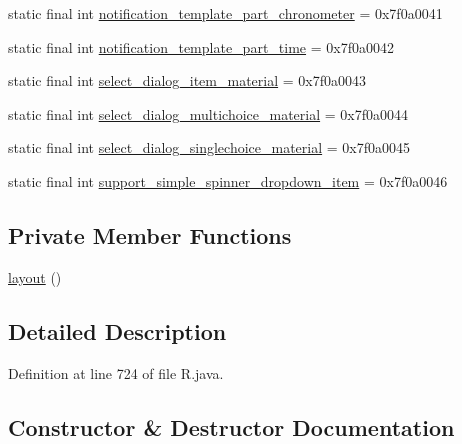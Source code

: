\begin{DoxyCompactItemize}
\item 
static final int \mbox{\hyperlink{classandroid_1_1support_1_1v7_1_1appcompat_1_1_r_1_1layout_a40ec1f0c58d5ef14dcdabd2917b39098}{notification\+\_\+template\+\_\+part\+\_\+chronometer}} = 0x7f0a0041
\item 
static final int \mbox{\hyperlink{classandroid_1_1support_1_1v7_1_1appcompat_1_1_r_1_1layout_a45b077fa0a865191a582090d784b1163}{notification\+\_\+template\+\_\+part\+\_\+time}} = 0x7f0a0042
\item 
static final int \mbox{\hyperlink{classandroid_1_1support_1_1v7_1_1appcompat_1_1_r_1_1layout_ac19040d9099a5f9d5427814ac4a16e37}{select\+\_\+dialog\+\_\+item\+\_\+material}} = 0x7f0a0043
\item 
static final int \mbox{\hyperlink{classandroid_1_1support_1_1v7_1_1appcompat_1_1_r_1_1layout_adaf8230a8b0f528256d97c8817a7ea3c}{select\+\_\+dialog\+\_\+multichoice\+\_\+material}} = 0x7f0a0044
\item 
static final int \mbox{\hyperlink{classandroid_1_1support_1_1v7_1_1appcompat_1_1_r_1_1layout_a5310ca432c171907a158a12388549c4b}{select\+\_\+dialog\+\_\+singlechoice\+\_\+material}} = 0x7f0a0045
\item 
static final int \mbox{\hyperlink{classandroid_1_1support_1_1v7_1_1appcompat_1_1_r_1_1layout_ad5f037f06366e908921922a2df0a8133}{support\+\_\+simple\+\_\+spinner\+\_\+dropdown\+\_\+item}} = 0x7f0a0046
\end{DoxyCompactItemize}
\subsection*{Private Member Functions}
\begin{DoxyCompactItemize}
\item 
\mbox{\hyperlink{classandroid_1_1support_1_1v7_1_1appcompat_1_1_r_1_1layout_a8b1d60e1280e3683b0039725ef876f2f}{layout}} ()
\end{DoxyCompactItemize}


\subsection{Detailed Description}


Definition at line 724 of file R.\+java.



\subsection{Constructor \& Destructor Documentation}
\mbox{\label{classandroid_1_1support_1_1v7_1_1appcompat_1_1_r_1_1layout_a8b1d60e1280e3683b0039725ef876f2f}} 
